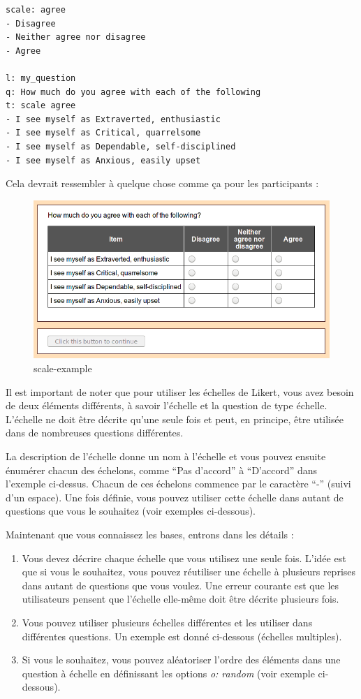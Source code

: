 \documentclass[
]{book}
\providecommand{\tightlist}{%
  \setlength{\itemsep}{0pt}\setlength{\parskip}{0pt}}
\begin{document}
\begin{verbatim}
scale: agree
- Disagree
- Neither agree nor disagree
- Agree

l: my_question
q: How much do you agree with each of the following
t: scale agree
- I see myself as Extraverted, enthusiastic
- I see myself as Critical, quarrelsome
- I see myself as Dependable, self-disciplined
- I see myself as Anxious, easily upset
\end{verbatim}

Cela devrait ressembler à quelque chose comme ça pour les participants :

\begin{figure}
\centering
\includegraphics{img/scale-example.png}
\caption{scale-example}
\end{figure}

Il est important de noter que pour utiliser les échelles de Likert, vous
avez besoin de deux éléments différents, à savoir l'échelle et la
question de type échelle. L'échelle ne doit être décrite qu'une seule
fois et peut, en principe, être utilisée dans de nombreuses questions
différentes.

La description de l'échelle donne un nom à l'échelle et vous pouvez
ensuite énumérer chacun des échelons, comme ``Pas d'accord'' à
``D'accord'' dans l'exemple ci-dessus. Chacun de ces échelons commence
par le caractère ``-'' (suivi d'un espace). Une fois définie, vous
pouvez utiliser cette échelle dans autant de questions que vous le
souhaitez (voir exemples ci-dessous).

Maintenant que vous connaissez les bases, entrons dans les détails :

\begin{enumerate}
\def\labelenumi{\arabic{enumi}.}
\tightlist
\item
  Vous devez décrire chaque échelle que vous utilisez une seule fois.
  L'idée est que si vous le souhaitez, vous pouvez réutiliser une
  échelle à plusieurs reprises dans autant de questions que vous voulez.
  Une erreur courante est que les utilisateurs pensent que l'échelle
  elle-même doit être décrite plusieurs fois.
\item
  Vous pouvez utiliser plusieurs échelles différentes et les utiliser
  dans différentes questions. Un exemple est donné ci-dessous (échelles
  multiples).
\item
  Si vous le souhaitez, vous pouvez aléatoriser l'ordre des éléments
  dans une question à échelle en définissant les options \emph{o:
  random} (voir exemple ci-dessous).
\end{enumerate}
\end{document}
